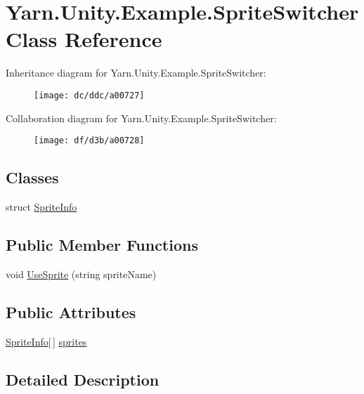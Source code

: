 \hypertarget{a00139}{\section{Yarn.\-Unity.\-Example.\-Sprite\-Switcher Class Reference}
\label{a00139}
}


Inheritance diagram for Yarn.\-Unity.\-Example.\-Sprite\-Switcher\-:
\nopagebreak
\begin{figure}[H]
\begin{center}
\leavevmode
\texttt{[image: dc/ddc/a00727]}
\end{center}
\end{figure}


Collaboration diagram for Yarn.\-Unity.\-Example.\-Sprite\-Switcher\-:
\nopagebreak
\begin{figure}[H]
\begin{center}
\leavevmode
\texttt{[image: df/d3b/a00728]}
\end{center}
\end{figure}
\subsection*{Classes}
\begin{DoxyCompactItemize}
\item 
struct \hyperlink{a00139_de/d55/a00323}{Sprite\-Info}
\end{DoxyCompactItemize}
\subsection*{Public Member Functions}
\begin{DoxyCompactItemize}
\item 
void \hyperlink{a00139_ac26718b713f342f3de8f3e569c5b62da}{Use\-Sprite} (string sprite\-Name)
\end{DoxyCompactItemize}
\subsection*{Public Attributes}
\begin{DoxyCompactItemize}
\item 
\hyperlink{a00139_de/d55/a00323}{Sprite\-Info}\mbox{[}$\,$\mbox{]} \hyperlink{a00139_a1e85d9f4f6b33ca7ae638cce2eb704aa}{sprites}
\end{DoxyCompactItemize}


\subsection{Detailed Description}


